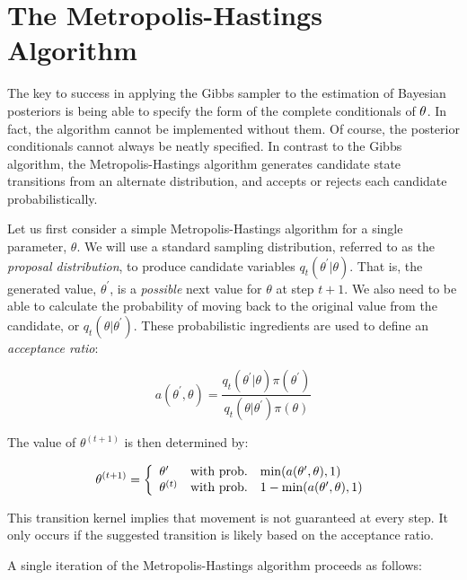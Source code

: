 
\hypertarget{the-metropolis-hastings-algorithm}{}
\section*{The Metropolis-Hastings Algorithm}

The key to success in applying the Gibbs sampler to the estimation of Bayesian posteriors is being able to specify the form of the complete conditionals of ${\bf \theta}$. In fact, the algorithm cannot be implemented without them. Of course, the posterior conditionals cannot always be neatly specified. In contrast to the Gibbs algorithm, the Metropolis-Hastings algorithm generates candidate state transitions from an alternate distribution, and accepts or rejects each candidate probabilistically.

Let us first consider a simple Metropolis-Hastings algorithm for a single parameter, $\theta$. We will use a standard sampling distribution, referred to as the \emph{proposal distribution}, to produce candidate variables $q_t(\theta^{\prime} | \theta)$. That is, the generated value, $\theta^{\prime}$, is a \emph{possible} next value for $\theta$ at step $t+1$. We also need to be able to calculate the probability of moving back to the original value from the candidate, or $q_t(\theta | \theta^{\prime})$. These probabilistic ingredients are used to define an \emph{acceptance ratio}:

\[
a(\theta^{\prime},\theta) = \frac{q_t(\theta^{\prime} | \theta) \pi(\theta^{\prime})}{q_t(\theta | \theta^{\prime}) \pi(\theta)}
\]

\noindent The value of $\theta^{(t+1)}$ is then determined by:

\[
\theta^{(t+1)} = \left\{\begin{array}{l@{\quad \mbox{with prob.} \quad}l}\theta^{\prime} & \min(a(\theta^{\prime},\theta),1) \\ \theta^{(t)} & 1 - \min(a(\theta^{\prime},\theta),1) \end{array}\right.
\]

\noindent This transition kernel implies that movement is not guaranteed at every step. It only occurs if the suggested transition is likely based on the acceptance ratio.

A single iteration of the Metropolis-Hastings algorithm proceeds as follows:

